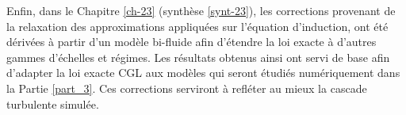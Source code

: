 Enfin, dans le Chapitre \ref{ch-23} (synthèse \ref{synt-23}), les corrections provenant de la relaxation des approximations appliquées sur l'équation d'induction, ont été dérivées à partir d'un modèle bi-fluide afin d'étendre la loi exacte à d'autres gammes d'échelles et régimes. Les résultats obtenus ainsi ont servi de base afin d'adapter la loi exacte \acs{CGL} aux modèles qui seront étudiés numériquement dans la Partie \ref{part_3}. Ces corrections serviront à refléter au mieux la cascade turbulente simulée.
